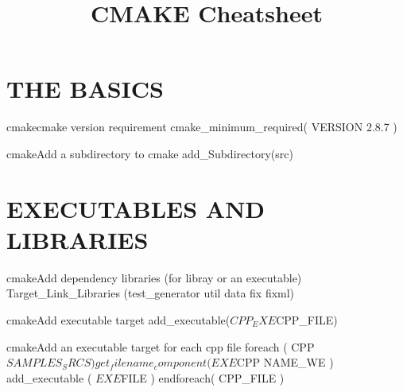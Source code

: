 \documentclass[10pt,a4paper]{article}
\title{\color{w3schools}CMAKE Cheatsheet
}
\begin{document}
\maketitle

\small
\begin{multicols}{3}

\thispagestyle{empty}
\scriptsize



\section{THE BASICS}

\begin{codebox}{cmake}{cmake version requirement}
cmake_minimum_required( VERSION 2.8.7 )

\end{codebox}

\begin{codebox}{cmake}{Add a subdirectory to cmake}
add_Subdirectory(src)

\end{codebox}

\section{EXECUTABLES AND LIBRARIES}


\begin{codebox}{cmake}{Add dependency libraries (for libray or an executable)}
Target_Link_Libraries (test_generator
	util data fix fixml)

\end{codebox}

\begin{codebox}{cmake}{Add executable target}
add_executable(${CPP_EXE} ${CPP_FILE})

\end{codebox}

\begin{codebox}{cmake}{Add an executable target for each cpp file}
foreach ( CPP ${SAMPLES_SRCS} ) 
   get_filename_component(EXE ${CPP} NAME_WE ) 
   add_executable ( ${EXE} ${FILE} )
endforeach( CPP_FILE )

\end{codebox}


\end{multicols}
\end{document}
